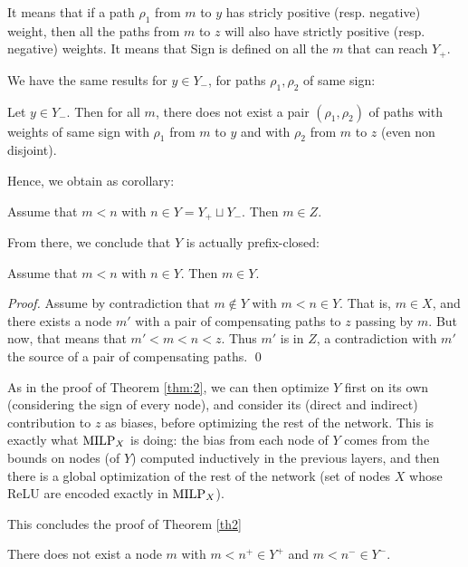 It means that if a path $\rho_1$ from $m$ to $y$ has stricly positive (resp. negative) weight, then all the paths from $m$ to $z$ will also have strictly positive (resp. negative) weights. It means that Sign is defined on all the $m$ that can reach $Y_+$.

We have the same results for $y \in Y_-$, for paths $\rho_1, \rho_2$ of same sign:

\begin{lemma}
	\label{lemma11}
	Let $y \in Y_-$. Then for all $m$, there does not exist a pair $(\rho_1,\rho_2)$ 
	of paths with weights of same sign with $\rho_1$ from $m$ to $y$ and 
	with $\rho_2$ from $m$ to $z$ (even non disjoint).
\end{lemma}

Hence, we obtain as corollary:

\begin{corollary}
\label{cor:simple}
Assume that $m < n$ with $n \in Y= Y_+ \sqcup Y_-$.
Then $m \in Z$.
\end{corollary}

From there, we conclude that $Y$ is actually prefix-closed:

\begin{lemma}
	\label{lemma12}
	Assume that $m < n$ with $n \in Y$.
	Then $m \in Y$.
\end{lemma}

\begin{proof}
Assume by contradiction that $m \notin Y$ with $m<n \in Y$.
That is, $m \in X$, and there exists a node $m'$ with a pair of compensating paths to $z$
passing by $m$. But now, that means that $m'<m<n<z$.
Thus $m'$ is in $Z$, a contradiction with $m'$ the source of a pair of compensating paths.
\qed
\end{proof}

As in the proof of Theorem \ref{thm:2}, we can then optimize $Y$ first on its own (considering the sign of every node), and consider its (direct and indirect) contribution to $z$ as biases, before optimizing the rest of the network.
This is exactly what ${\textrm{MILP}}_X$ is doing:
the bias from each node of $Y$ comes from the bounds on nodes (of $Y$) computed inductively in the previous layers, and then there is a global optimization of the rest of the network (set of nodes $X$ whose ReLU are encoded exactly in ${\textrm{MILP}}_X$).

This concludes the proof of Theorem \ref{th2}

\iffalse


\begin{lemma}
	There does not exist a node $m$ with $m<n^+ \in Y^+$ and $m<n^- \in Y^-$.
	\end{lemma}
	
